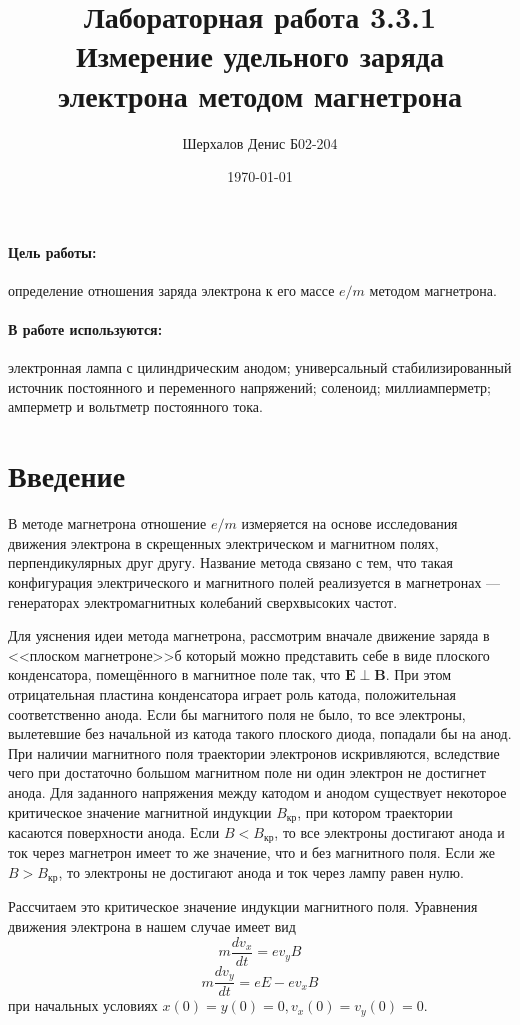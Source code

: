 \documentclass[a4paper,12pt]{article}
\author{Шерхалов Денис Б02-204}
\title{Лабораторная работа 3.3.1 \\
	\textbf{Измерение удельного заряда электрона методом магнетрона}}
\date{\today}
\begin{document}
	
	{\Large \maketitle}

	\paragraph*{Цель работы:} определение отношения заряда электрона к его массе $e/m$ методом магнетрона. 
	\paragraph*{В работе используются:} электронная лампа с цилиндрическим анодом; универсальный стабилизированный источник постоянного и переменного напряжений; соленоид; миллиамперметр; амперметр и вольтметр постоянного тока.
	
	\section{Введение}
	В методе магнетрона отношение $e / m$ измеряется на основе исследования движения электрона в скрещенных электрическом и магнитном полях, перпендикулярных друг другу. Название метода связано с тем, что такая конфигурация электрического и магнитного полей реализуется в магнетронах --- генераторах электромагнитных колебаний сверхвысоких частот.

	Для уяснения идеи метода магнетрона, рассмотрим вначале движение заряда в <<плоском магнетроне>>б который можно представить себе в виде плоского конденсатора, помещённого в магнитное поле так, что $\boldsymbol{E} \perp \boldsymbol{B}$. При этом отрицательная пластина конденсатора играет роль катода, положительная соответственно анода.  Если бы магнитого поля не было, то все электроны, вылетевшие без начальной из катода такого плоского диода, попадали бы на анод. При наличии магнитного поля траектории электронов искривляются, вследствие чего при достаточно большом магнитном поле ни один электрон не достигнет анода.
	Для заданного напряжения между катодом и анодом существует некоторое критическое значение магнитной индукции $B_\text{кр}$, при котором траектории касаются поверхности анода. Если $B < B_\text{кр}$, то все электроны достигают анода и ток через магнетрон имеет то же значение, что и без магнитного поля. Если же $B > B_\text{кр}$, то электроны не достигают анода и ток через лампу равен нулю.

	Рассчитаем это критическое значение индукции магнитного поля. Уравнения движения электрона в нашем случае имеет вид
	$$m \frac{d v_x}{d t} = e v_y B$$
	$$m \frac{d v_y}{d t} = e E - e v_x B$$
	при начальных условиях $x(0) = y(0) = 0, v_x(0) = v_y (0) = 0$.
\end{document}

